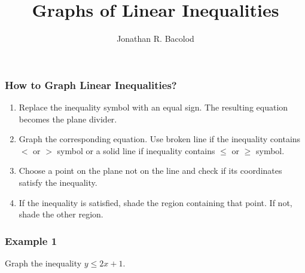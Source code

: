 \documentclass[14pt]{beamer}
\title[] {Graphs of Linear Inequalities}
\author{Jonathan R. Bacolod}
\institute[SHS]{Sauyo High School}
\date{}
\begin{document}
	\frame{\titlepage}
	
	\begin{frame}
		\frametitle{How to Graph Linear Inequalities?}
		
		\begin{enumerate}
			\item Replace the inequality symbol with an equal sign. The resulting equation becomes	the plane divider.
			\item \pause Graph the corresponding equation. Use broken line if the inequality contains $ < $ or $ > $ symbol or a solid line if inequality contains $ \leq $ or $ \geq $ symbol.
			\item \pause  Choose a point on the plane not on the line and check if its coordinates satisfy the inequality.
			\item \pause  If the inequality is satisfied, shade the region containing that point. If not, shade the other region.
		\end{enumerate}   
	\end{frame}

    \begin{frame}
    	\frametitle{Example 1}
    	Graph the inequality $ y \leq 2x + 1 $.
    \end{frame}
\end{document}
